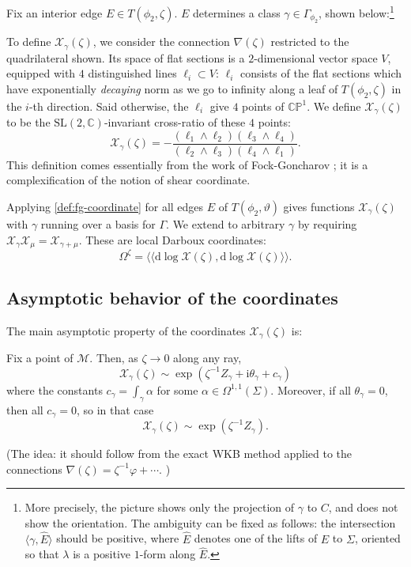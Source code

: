 \documentclass[12pt,letterpaper,reqno]{article}
\numberwithin{equation}{section}
\newcommand{\cM}{\ensuremath{\mathcal M}}
\newcommand{\cX}{\ensuremath{\mathcal X}}
\newcommand{\bbC}{\ensuremath{\mathbb C}}
\newcommand{\bbP}{\ensuremath{\mathbb P}}
\newcommand{\I}{{\mathrm i}}
\newcommand{\de}{\mathrm{d}}
\newcommand{\IP}[1]{\langle#1\rangle}
\newcommand{\DIP}[1]{\langle\!\langle#1\rangle\!\rangle}
\newcommand{\ti}[1]{\textit{#1}}
\newcommand{\SL}{\mathrm{SL}}
\newcommand{\insfig}[2]{

\medskip
\noindent
\begin{minipage}{\linewidth}

\makebox[\linewidth]{\texttt{[image: figures/\#1-crop.pdf]}}

\end{minipage}
\medskip

}
\newcommand{\fixme}[1]{{\color{orange}{[#1]}}}
\begin{document}
\begin{defn} \label{def:fg-coordinate}
Fix an interior edge $E \in T(\phi_2,\zeta)$.
$E$ determines a class $\gamma \in \Gamma_{\phi_2}$, shown
below:\footnote{More precisely, the picture shows
only the projection of $\gamma$ to $C$, and does not show
the orientation. The ambiguity can be fixed as follows:
the intersection $\IP{\gamma,\hat E}$ should be positive,
where $\hat E$ denotes one of the lifts of $E$ to $\Sigma$,
oriented so that $\lambda$ is a positive $1$-form
along $\hat E$.}
\insfig{higgs-metric-10}{1.3}
To define $\cX_\gamma(\zeta)$, we consider the connection
$\nabla(\zeta)$ restricted to the quadrilateral shown.
Its space of flat sections is a $2$-dimensional vector space $V$,
equipped with $4$ distinguished lines $\ell_i \subset V$:
$\ell_i$ consists of the flat sections
which have exponentially \ti{decaying} norm 
as we go to infinity along a leaf of $T(\phi_2,\zeta)$ in the $i$-th direction.
Said otherwise, the $\ell_i$ give $4$ points of $\bbC\bbP^1$.
We define $\cX_\gamma(\zeta)$ to be the
$\SL(2,\bbC)$-invariant cross-ratio of these $4$ points:
\begin{equation}
	\cX_\gamma(\zeta) = - \frac{(\ell_1 \wedge \ell_2)(\ell_3 \wedge \ell_4)}{(\ell_2 \wedge \ell_3) (\ell_4 \wedge \ell_1)} .
\end{equation}
This definition comes essentially from
the work of Fock-Goncharov \cite{MR2233852}; it is a complexification of the notion of shear coordinate.
\end{defn}

Applying \autoref{def:fg-coordinate} for all edges $E$
of $T(\phi_2,\vartheta)$ gives functions
$\cX_\gamma(\zeta)$ with $\gamma$ running over a basis for $\Gamma$. 
We extend to arbitrary $\gamma$ by requiring
$\cX_\gamma \cX_\mu = \cX_{\gamma+\mu}$.
These are local
Darboux coordinates:
\begin{equation}
  \Omega^\zeta = \DIP{\de \log \cX(\zeta), \de \log \cX(\zeta)}.
\end{equation}

\subsection{Asymptotic behavior of the coordinates}

The main asymptotic property of the coordinates $\cX_\gamma(\zeta)$ is:
\begin{conj}
Fix a point of $\cM$.
Then, as $\zeta \to 0$ along any ray,
\begin{equation}
  \cX_\gamma(\zeta) \sim \exp \left(\zeta^{-1} Z_\gamma + \I \theta_\gamma + c_\gamma \right)
\end{equation}
where the constants $c_\gamma = \int_\gamma \alpha$
for some $\alpha \in \Omega^{1,1}(\Sigma)$.
Moreover, if all $\theta_\gamma = 0$, then
all $c_\gamma = 0$, so in that case
\begin{equation}
  \cX_\gamma(\zeta) \sim \exp \left(\zeta^{-1} Z_\gamma\right).
\end{equation}
\end{conj}
(The idea: it should follow from the exact WKB method applied to the connections $\nabla(\zeta) = \zeta^{-1} \varphi + \cdots$. \fixme{explain a little more?})
\end{document}
